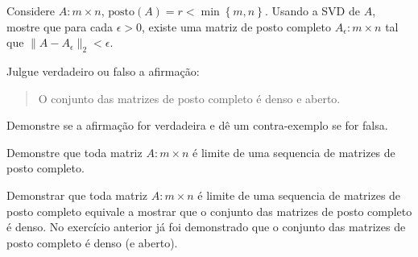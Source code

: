 \documentclass[a4paper,12pt, leqno, answers]{exam}
\begin{document}
\begin{questions}
    \question Considere $A : m \times n$, $\textrm{posto}(A) = r < \min\left\{ m, n \right\}$. Usando a SVD de $A$, mostre que para cada $\epsilon > 0$, existe uma matriz de posto completo $A_\epsilon : m \times n$ tal que $\| A - A_\epsilon \|_2 < \epsilon$.

    \question Julgue verdadeiro ou falso a afirma\c{c}\~{a}o:
    \begin{quote}
        O conjunto das matrizes de posto completo \'{e} denso e aberto.
    \end{quote}
    Demonstre se a afirma\c{c}\~{a}o for verdadeira e d\^{e} um contra-exemplo se for falsa.
    \begin{solution}
    \end{solution}

    \question Demonstre que toda matriz $A : m \times n$ \'{e} limite de uma sequencia de matrizes de posto completo.
    \begin{solution}
        Demonstrar que toda matriz $A : m \times n$ \'{e} limite de uma sequencia de matrizes de posto completo equivale a mostrar que o conjunto das matrizes de posto completo \'{e} denso. No exerc\'{i}cio anterior j\'{a} foi demonstrado que o conjunto das matrizes de posto completo \'{e} denso (e aberto).
    \end{solution}


\end{questions}
\end{document}
